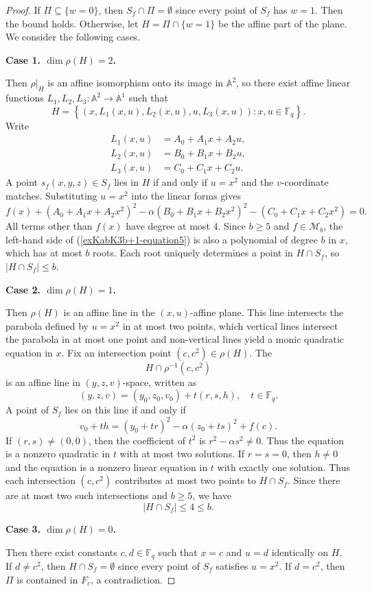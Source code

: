 \documentclass[11pt,a4paper]{article}
\theoremstyle{definition}
\theoremstyle{remark}
\begin{document}
\begin{proof}
If $\Pi \subseteq \{w = 0\}$, then $S_f \cap \Pi = \emptyset$ since every point of $S_f$ has $w = 1$. Then the bound holds. Otherwise, let
$
H = \Pi \cap \{w = 1\}
$
be the affine part of the plane. We consider the following cases.

\medskip
\noindent \textbf{Case 1. $\dim \rho(H) = 2$.}

Then $\rho|_H$ is an affine isomorphism onto its image in $\mathbb{A}^2$, so there exist affine linear functions $L_1, L_2, L_3 : \mathbb{A}^2 \to \mathbb{A}^1$ such that
\[
H = \left\{ (x, L_1(x, u), L_2(x, u), u, L_3(x, u)) : x, u \in \mathbb{F}_q \right\}.
\]
Write
\[
\begin{aligned}
L_1(x, u) &= A_0 + A_1 x + A_2 u, \\
L_2(x, u) &= B_0 + B_1 x + B_2 u, \\
L_3(x, u) &= C_0 + C_1 x + C_2 u.
\end{aligned}
\]
A point $s_f(x,y,z) \in S_f$ lies in $H$ if and only if $u = x^2$ and the $v$-coordinate matches. Substituting $u = x^2$ into the linear forms gives
\begin{equation}\label{exKabK3b+1-equation5}
f(x) + (A_0 + A_1 x + A_2 x^2)^2 - \alpha (B_0 + B_1 x + B_2 x^2)^2 - (C_0 + C_1 x + C_2 x^2)=0.
\end{equation}
All terms other than $f(x)$ have degree at most $4$. Since $b \geq 5$ and $f\in \mathcal{M}_b$, the left-hand side of (\ref{exKabK3b+1-equation5}) is also a   polynomial of degree $b$ in $x$, which has at most $b$ roots. Each root uniquely determines a point in $H \cap S_f$, so $|H \cap S_f| \leq b$.

\medskip
\noindent \textbf{Case 2. $\dim \rho(H) = 1$.}

Then $\rho(H)$ is an affine line in the $(x,u)$-affine plane. This line intersects the parabola defined by $u = x^2$ in at most two points, which vertical lines intersect the parabola in at most one point and non-vertical lines yield a monic quadratic equation in $x$.
Fix an intersection point $(c, c^2) \in \rho(H)$. The 
\[
H \cap \rho^{-1}(c, c^2)
\]
is an affine line in $(y,z,v)$-space, written as
\[
(y, z, v) = (y_0, z_0, v_0) + t(r, s, h), \quad t \in \mathbb{F}_q.
\]
A point of $S_f$ lies on this line if and only if
\[
v_0 + t h = (y_0 + t r)^2 - \alpha (z_0 + t s)^2 + f(c).
\]
If $(r,s) \neq (0,0)$, then the coefficient of $t^2$ is $r^2 - \alpha s^2 \neq 0$. Thus the equation is a nonzero quadratic in $t$ with at most two solutions. If $r = s = 0$, then $h \neq 0$ and the equation is a nonzero linear equation in $t$ with exactly one solution.
Thus each intersection $(c,c^2)$ contributes at most two points to $H \cap S_f$. Since there are at most two such intersections and $b \geq 5$, we have
\[
|H \cap S_f| \leq 4 \leq b.
\]


\medskip
\noindent \textbf{Case 3. $\dim \rho(H) = 0$.}

Then there exist constants $c,d \in \mathbb{F}_q$ such that $x = c$ and $u = d$ identically on $H$. If $d \neq c^2$, then $H \cap S_f = \emptyset$ since every point of $S_f$ satisfies $u = x^2$. If $d = c^2$, then $\Pi$ is contained in $F_c$, a contradiction.
\end{proof}
\end{document}
